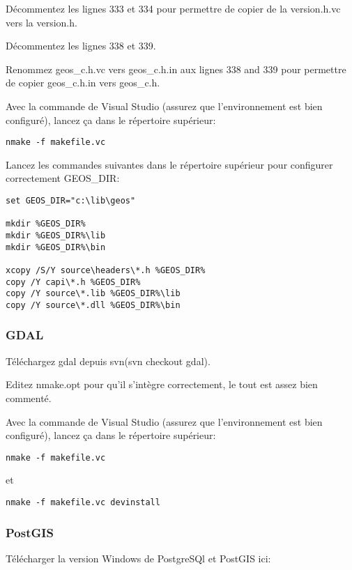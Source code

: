 D\'ecommentez les lignes 333 et 334 pour permettre de copier de la version.h.vc vers la version.h.

D\'ecommentez les lignes 338 et 339.

Renommez geos\_c.h.vc vers geos\_c.h.in aux lignes 338 and 339 pour permettre de copier geos\_c.h.in vers geos\_c.h.

Avec la commande de Visual Studio (assurez que l'environnement est bien configur\'e), lancez \c{c}a dans le r\'epertoire sup\'erieur:

\begin{verbatim}
nmake -f makefile.vc 
\end{verbatim}

Lancez les commandes suivantes dans le r\'epertoire sup\'erieur pour configurer correctement GEOS\_DIR:

\begin{verbatim}
set GEOS_DIR="c:\lib\geos"

mkdir %GEOS_DIR%
mkdir %GEOS_DIR%\lib
mkdir %GEOS_DIR%\bin

xcopy /S/Y source\headers\*.h %GEOS_DIR%
copy /Y capi\*.h %GEOS_DIR%
copy /Y source\*.lib %GEOS_DIR%\lib
copy /Y source\*.dll %GEOS_DIR%\bin
\end{verbatim}

\subsubsection{GDAL}
T\'el\'echargez gdal depuis svn(svn checkout  gdal).

Editez nmake.opt pour qu'il s'int\`egre correctement, le tout est assez bien comment\'e.

Avec la commande de Visual Studio (assurez que l'environnement est bien configur\'e), lancez \c{c}a dans le r\'epertoire sup\'erieur:

\begin{verbatim}
nmake -f makefile.vc 
\end{verbatim}

et

\begin{verbatim}
nmake -f makefile.vc devinstall 
\end{verbatim}

\subsubsection{PostGIS}
T\'el\'echarger la version Windows de PostgreSQl et PostGIS ici:

